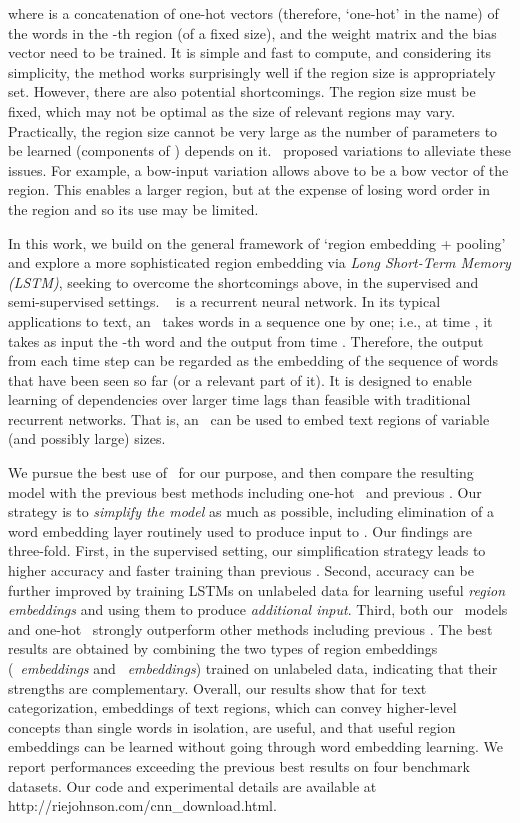 \documentclass{article}
\begin{document}
where  is a concatenation of one-hot vectors (therefore, `one-hot' in the name) 
of the words in the -th region (of a fixed size), 
and the weight matrix  and the bias vector  need to be trained.  
It is simple and fast to compute, and considering its simplicity,
the method works surprisingly well if the region size is appropriately set.  
However, there are also potential shortcomings.  
The region size must be fixed, which may not be optimal as the size of 
relevant regions may vary.  Practically, the region size cannot be very large 
as the number of parameters to be learned (components of ) depends on it. 
\JZab\ proposed variations to alleviate these issues.  For example, a bow-input variation allows 
 above to be a bow vector of the region.  This enables a larger region, but 
at the expense of losing word order in the region and so its use may be limited.  


In this work, we build on the general framework of `region embedding + pooling' 
and explore a more sophisticated region embedding via {\em Long Short-Term Memory (LSTM)}, 
seeking to overcome the shortcomings above, 
in the supervised and semi-supervised settings. 
\lstm\ \cite{HS97} is a recurrent neural network.  In its typical applications to text, 
an \lstm\ takes words in a sequence one by one; i.e., 
at time , it takes as input the -th word and the output from time .  
Therefore, the output from each time step can be regarded as the embedding of the sequence of words 
that have been seen so far (or a relevant part of it). 
It is designed to enable learning of dependencies over larger time lags 
than feasible with traditional recurrent networks. 
That is, an \lstm\ can be used to embed text regions of variable (and possibly large) sizes. 

We pursue the best use of \lstm\ for our purpose, and then compare the resulting model 
with the previous best methods including one-hot \cnn\ and previous \lstm.  
Our strategy is to {\em simplify the model} as much as possible, 
including elimination of a word embedding layer routinely used to produce input to \lstm. 
Our findings are three-fold.  
First, in the supervised setting, 
our simplification strategy 
leads to higher accuracy and faster training than previous \lstm. 
Second, 
accuracy can be further improved by training 
LSTMs on unlabeled data 
for learning useful {\em region embeddings} and using them to produce {\em additional input}. 
Third, 
both our \lstm\ models and one-hot \cnn\ 
strongly outperform other methods including 
previous \lstm.  The best results are obtained by combining the two types of region embeddings 
({\em \lstm\ embeddings} and {\em \cnn\ embeddings}) trained on unlabeled data,  
indicating that their strengths are complementary. 
Overall, our results show that for text categorization, 
embeddings of text regions, which can convey higher-level concepts than single words in isolation, 
are useful, 
and that useful region embeddings can be learned 
without going through word embedding learning. 
We report performances exceeding the previous best results on four benchmark datasets. 
Our code and experimental details are available 
at http://riejohnson.com/cnn\_download.html. 
\end{document}

